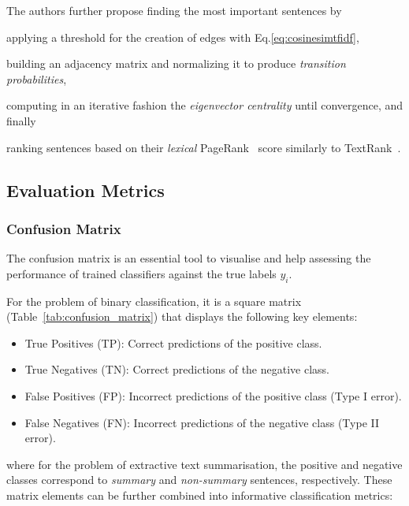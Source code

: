 The authors further propose finding the most important sentences by \begin{enumerate*}
    \item applying a threshold for the creation of edges with Eq.\ref{eq:cosinesimtfidf},
    \item building an adjacency matrix and normalizing it to produce \emph{transition probabilities},
    \item computing in an iterative fashion the \emph{eigenvector centrality} until convergence, and finally
    \item ranking sentences based on their \emph{lexical} PageRank~\cite{page1998anatomy} score similarly to TextRank~\cite{mihalcea-tarau-2004-textrank}.
\end{enumerate*}

\subsection{Evaluation Metrics}\label{subsec:evaluation-metrics}
\subsubsection{Confusion Matrix}\label{subsubsec:confusion-matrix}
The confusion matrix is an essential tool to visualise and help assessing the performance of trained classifiers against
the true labels $y_{i}$.

For the problem of binary classification, it is a square matrix (Table~\ref{tab:confusion_matrix}) that displays the
following key elements:

\begin{itemize}
    \item True Positives (TP): Correct predictions of the positive class.
    \item True Negatives (TN): Correct predictions of the negative class.
    \item False Positives (FP): Incorrect predictions of the positive class (Type I error).
    \item False Negatives (FN): Incorrect predictions of the negative class (Type II error).
\end{itemize}

where for the problem of extractive text summarisation, the positive and negative classes correspond to \emph{summary}
and \emph{non-summary} sentences, respectively.
These matrix elements can be further combined into informative classification metrics:

